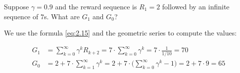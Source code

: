 \begin{exercise}
Suppose $\gamma = 0.9$ and the reward sequence is $R_1 = 2$ followed by an infinite sequence of $7$s.
What are $G_1$ and $G_0$?
\end{exercise}

\begin{solution}
We use the formula \eqref{eq:2.15} and the geometric series to compute the values:

\begin{align*}
  G_1
  &=
  \sum_{k=0}^\infty \gamma^k R_{k+2}
  =
  7 \cdot \sum_{k=0}^\infty \gamma^k
  =
  7 \cdot \frac{1}{1/10}
  =
  70 \\
  G_0
  &=
  2 + 7 \cdot \sum_{k=1}^\infty \gamma^k
  =
  2 + 7\cdot \bigg( \sum_{k=0}^\infty \gamma^k - 1\bigg)
  =
  2 + 7 \cdot 9
  =
  65
  \end{align*}
\end{solution}
